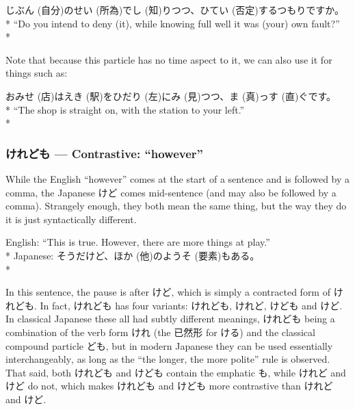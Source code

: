 \documentclass[11pt, b5paper, twoside, openright, onecolumn]{book}
\makeatletter
\newcommand*{\rubystack}[2]{{\relscale{0.5}%
  \begin{tabular}[b]{@{}c@{}}%
    {#1}\\%
   {\textscale{2}{#2}}%
  \end{tabular}}%
}
\DeclareRobustCommand*{\ruby}[2]{%
  \mbox{%
    \setlength{\parskip}{0ex}%
    \BeginAccSupp{method=pdfstringdef,ActualText={#1}}%
      \rubystack{\phantom{#2}}{#1}%
      \llap{%
        \rubystack{#2}{\phantom{#1}}%
      }%
    \EndAccSupp{}%
  }%
}
\renewcommand*{\ruby}[2]{#2 (#1)}%
\newenvironment{exampleblock}{
\setlength{\parindent}{0.6in}
\begin{minipage}[t]{\dimexpr\textwidth-\parindent}}
{\end{minipage}}
\makeatother
\begin{document}
\vspace{0.4cm}
\begin{exampleblock}
\ruby{自分}{じぶん}の\ruby{所為}{せい}で\ruby{知}{し}りつつ、\ruby{否定}{ひてい}するつもりですか。 \\* 
“Do you intend to deny (it)‚ while knowing full well it was (your) own fault?” \\* 
\end{exampleblock}
\vspace{0.2cm}

Note that because this particle has no time aspect to it‚ we can also use it for things such as:

\vspace{0.4cm}
\begin{exampleblock}
お\ruby{店}{みせ}は\ruby{駅}{えき}を\ruby{左}{ひだり}に\ruby{見}{み}つつ、\ruby{真}{ま}っ\ruby{直}{す}ぐです。 \\* 
“The shop is straight on‚ with the station to your left.” \\* 
\end{exampleblock}
\subsubsection{けれども — Contrastive: “however”}


While the English “however” comes at the start of a sentence and is followed by a comma‚ the Japanese けど comes mid-sentence (and may also be followed by a comma). Strangely enough‚ they both mean the same thing‚ but the way they do it is just syntactically different.

\vspace{0.4cm}
\begin{exampleblock}
English: “This is true. However‚ there are more things at play.” \\* 
Japanese: そうだけど、\ruby{他}{ほか}の\ruby{要素}{ようそ}もある。 \\* 
\end{exampleblock}
\vspace{0.2cm}

In this sentence‚ the pause is after けど‚ which is simply a contracted form of けれども. In fact‚ けれども has four variants: けれども‚ けれど‚ けども and けど. In classical Japanese these all had subtly different meanings‚ けれども being a combination of the verb form けれ (the 已然形 for ける) and the classical compound particle ども‚ but in modern Japanese they can be used essentially interchangeably‚ as long as the “the longer‚ the more polite” rule is observed. That said‚ both けれども and けども contain the emphatic も‚ while けれど and けど do not‚ which makes けれども and けども more contrastive than けれど and けど.
\end{document}
